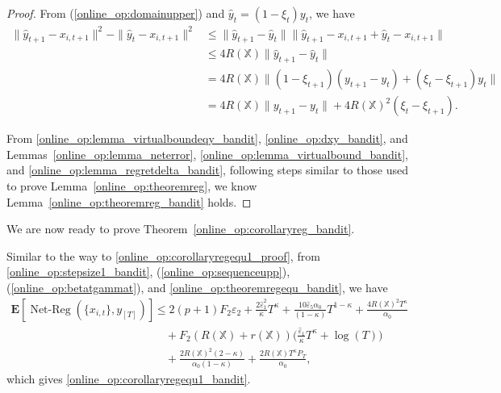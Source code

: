 \documentclass[12pt,draftcls,onecolumn]{IEEEtran}%
\DeclareMathOperator{\NetReg}{Net-Reg}
\begin{document}
\begin{proof}
From (\ref{online_op:domainupper}) and $\hat{y}_{t}=(1-\xi_t)y_{t}$, we have
\begin{align}\label{online_op:dxy_bandit}
\|\hat{y}_{t+1}-x_{i,t+1}\|^2-\|\hat{y}_t-x_{i,t+1}\|^2
&\le\|\hat{y}_{t+1}-\hat{y}_t\|\|\hat{y}_{t+1}-x_{i,t+1}+\hat{y}_t-x_{i,t+1}\|\nonumber\\
&\le4R(\mathbb{X})\|\hat{y}_{t+1}-\hat{y}_t\|\nonumber\\
&=4R(\mathbb{X})\|(1-\xi_{t+1})(y_{t+1}-y_t)+(\xi_t-\xi_{t+1})y_t\|\nonumber\\
&=4R(\mathbb{X})\|y_{t+1}-y_t\|+4R(\mathbb{X})^2(\xi_t-\xi_{t+1}).
\end{align}

From \eqref{online_op:lemma_virtualboundeqy_bandit}, \eqref{online_op:dxy_bandit}, and Lemmas~\ref{online_op:lemma_neterror}, \ref{online_op:lemma_virtualbound_bandit}, and \ref{online_op:lemma_regretdelta_bandit}, following steps similar to those used to prove Lemma~\ref{online_op:theoremreg}, we know Lemma~\ref{online_op:theoremreg_bandit} holds.
\end{proof}

We are now ready to prove Theorem~\ref{online_op:corollaryreg_bandit}.

 Similar to the way to \eqref{online_op:corollaryregequ1_proof}, from \eqref{online_op:stepsize1_bandit}, (\ref{online_op:sequenceupp}), (\ref{online_op:betatgammat}), and \eqref{online_op:theoremregequ_bandit}, we have
\begin{align*}%
\mathbf{E}[\NetReg(\{x_{i,t}\},y_{[T]})]
&\le 2(p+1)F_2\varepsilon_2
+\frac{2\hat{\varepsilon}^2_1}{\kappa}T^\kappa+\frac{10\hat{\varepsilon}_5\alpha_0}{(1-\kappa)}T^{1-\kappa}
+\frac{4R(\mathbb{X})^2T^\kappa}{\alpha_0}\nonumber\\
&\quad+F_2(R(\mathbb{X})+r(\mathbb{X}))\Big(\frac{\hat{\varepsilon}_1}{\kappa}T^\kappa+\log(T)\Big)
\nonumber\\
&\quad+\frac{2R(\mathbb{X})^2(2-\kappa)}{\alpha_0(1-\kappa)}+\frac{2R(\mathbb{X})T^\kappa P_T}{\alpha_0},
\end{align*}
which gives \eqref{online_op:corollaryregequ1_bandit}.
\end{document}
